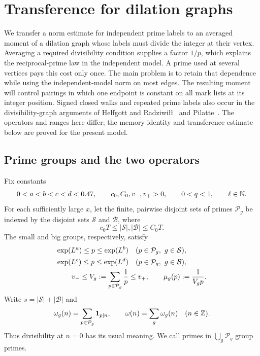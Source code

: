 \section{Transference for dilation graphs}\label{sec:transference}

We transfer a norm estimate for independent prime labels to an averaged
moment of a dilation graph whose labels must divide the integer at their
vertex.  Averaging a required divisibility condition supplies a factor
$1/p$, which explains the reciprocal-prime law in the independent model.
A prime used at several vertices pays this cost only once.  The main
problem is to retain that dependence while using the independent-model
norm on most edges.  The resulting moment will control pairings in which
one endpoint is constant on all mark lists at its integer position.
Signed closed walks and repeated prime labels also occur in the
divisibility-graph arguments of
Helfgott and Radziwi{\l}{\l}~\cite[Section~1.5]{HelfgottRadziwill2021}
and Pilatte~\cite[Sections~3 and~5]{Pilatte2026}.
The operators and ranges here differ; the memory identity and
transference estimate below are proved for the present model.

\subsection{Prime groups and the two operators}

\begin{definition}\label{def:prime-groups}
Fix constants
\[
 0<a<b<c<d<0.47,\qquad c_0,C_0,v_-,v_+>0,
 \qquad 0<q<1,\qquad \ell\in\mathbb N.
\]
For each sufficiently large $x$, let the finite, pairwise disjoint sets
of primes $\mathcal P_g$ be indexed by the disjoint sets
$\mathcal S$ and $\mathcal B$, where
\[
 c_0T\le |\mathcal S|,|\mathcal B|\le C_0T.
\]
The small and big groups, respectively, satisfy
\begin{align}
 \exp(L^a)\le p\le\exp(L^b)&\quad(p\in\mathcal P_g,
                 \ g\in\mathcal S),\notag\\
 \exp(L^c)\le p\le\exp(L^d)&\quad(p\in\mathcal P_g,
                 \ g\in\mathcal B),\label{eq:prime-group-ranges}\\
 v_-\le V_g:=\sum_{p\in\mathcal P_g}\frac1p&\le v_+,
 \qquad \mu_g(p):=\frac1{V_gp}.\notag
\end{align}
Write $s=|\mathcal S|+|\mathcal B|$ and
\[
 \omega_g(n)=\sum_{p\in\mathcal P_g}\mathbf 1_{p\mid n},
 \qquad \omega(n)=\sum_g\omega_g(n)
 \quad(n\in\mathbb Z).
\]
Thus divisibility at $n=0$ has its usual meaning.  We call primes in
$\bigcup_g\mathcal P_g$ group primes.
\end{definition}

